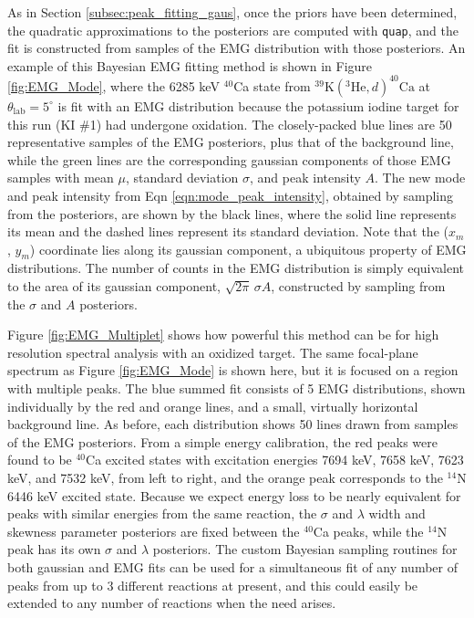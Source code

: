 As in Section \ref{subsec:peak_fitting_gaus}, once the priors have been determined, the quadratic approximations to the posteriors are computed with \texttt{quap}, and the fit is constructed from samples of the EMG distribution with those posteriors. An example of this Bayesian EMG fitting method is shown in Figure \ref{fig:EMG_Mode}, where the 6285 keV $^{40}$Ca state from $^{39}\mathrm{K}(^{3}\mathrm{He},d)^{40}\mathrm{Ca}$ at $\theta_{\mathrm{lab}} = 5^{\circ}$ is fit with an EMG distribution because the potassium iodine target for this run (KI $\#$1) had undergone oxidation. %
The closely-packed blue lines are 50 representative samples of the EMG posteriors, plus that of the background line, while the green lines are the corresponding gaussian components of those EMG samples with mean $\mu$, standard deviation $\sigma$, and peak intensity $A$. The new mode and peak intensity from Eqn \ref{eqn:mode_peak_intensity}, obtained by sampling from the posteriors, are shown by the black lines, where the solid line represents its mean and the dashed lines represent its standard deviation. Note that the ($x_{m}$, $y_{m}$) coordinate lies along its gaussian component, a ubiquitous property of EMG distributions. The number of counts in the EMG distribution is simply equivalent to the area of its gaussian component, $\sqrt{2\pi} \, \sigma A$, constructed by sampling from the $\sigma$ and $A$ posteriors.

Figure \ref{fig:EMG_Multiplet} shows how powerful this method can be for high resolution spectral analysis with an oxidized target. The same focal-plane spectrum as Figure \ref{fig:EMG_Mode} is shown here, but it is focused on a region with multiple peaks. The blue summed fit consists of 5 EMG distributions, shown individually by the red and orange lines, and a small, virtually horizontal background line. As before, each distribution shows 50 lines drawn from samples of the EMG posteriors. From a simple energy calibration, the red peaks were found to be $^{40}$Ca excited states with excitation energies 7694 keV, 7658 keV, 7623 keV, and 7532 keV, from left to right, and the orange peak corresponds to the $^{14}$N 6446 keV excited state. Because we expect energy loss to be nearly equivalent for peaks with similar energies from the same reaction, the $\sigma$ and $\lambda$ width and skewness parameter posteriors are fixed between the $^{40}$Ca peaks, while the $^{14}$N peak has its own $\sigma$ and $\lambda$ posteriors. The custom Bayesian sampling routines for both gaussian and EMG fits can be used for a simultaneous fit of any number of peaks from up to 3 different reactions at present, and this could easily be extended to any number of reactions when the need arises.

